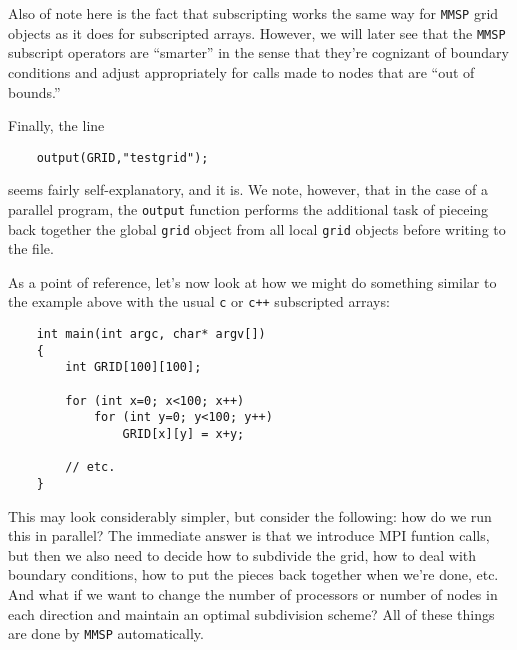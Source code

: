 Also of note here is the fact that subscripting works the same way for {\tt MMSP} grid objects as it does for subscripted arrays.  However, we will later see that the {\tt MMSP} subscript operators are ``smarter'' in the sense that they're cognizant of boundary conditions and adjust appropriately for calls made to nodes that are 	``out of bounds.''

Finally, the line 
\begin{shadebox}
\begin{verbatim}
    output(GRID,"testgrid");
\end{verbatim}
\end{shadebox}
seems fairly self-explanatory, and it is.  We note, however, that in the case of a parallel program, the {\tt output} function performs the additional task of pieceing back together the global {\tt grid} object from all local {\tt grid} objects before writing to the file.

As a point of reference, let's now look at how we might do something similar to the example above with the usual {\tt c} or {\tt c++} subscripted arrays:
\begin{shadebox}
\begin{verbatim}
    int main(int argc, char* argv[])
    {
        int GRID[100][100];

        for (int x=0; x<100; x++)
            for (int y=0; y<100; y++)
                GRID[x][y] = x+y;

        // etc.
    }
\end{verbatim}
\end{shadebox}
This may look considerably simpler, but consider the following: how do we run this in parallel?  The immediate answer is that we introduce MPI funtion calls, but then we also need to decide how to subdivide the grid, how to deal with boundary conditions, how to put the pieces back together when we're done, etc.  And what if we want to change the number of processors or number of nodes in each direction and maintain an optimal subdivision scheme?  All of these things are done by {\tt MMSP} automatically.

\vfill
\pagebreak
